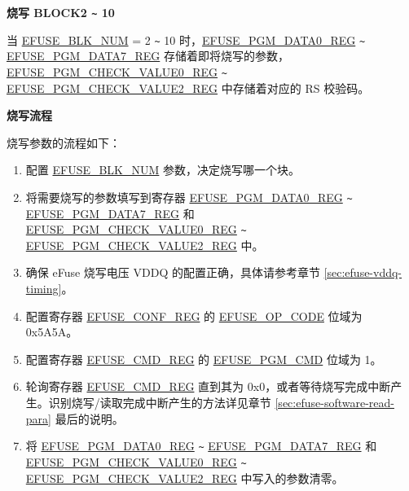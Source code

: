 \documentclass[main\_\_CN.tex]{subfiles}
\begin{document}
{\bfseries 烧写 BLOCK2 \verb+~+ 10}

当 \hyperref[fielddesc:EFUSEBLKNUM]{EFUSE\_BLK\_NUM} = 2 \verb+~+ 10 时，\hyperref[regdesc:EFUSEPGMDATA0REG]{EFUSE\_PGM\_DATA0\_REG} \verb+~+ \hyperref[regdesc:EFUSEPGMDATA7REG]{EFUSE\_PGM\_DATA7\_REG} 存储着即将烧写的参数，\hyperref[regdesc:EFUSEPGMCHECKVALUE0REG]{EFUSE\_PGM\_CHECK\_VALUE0\_REG}  \verb+~+ \hyperref[regdesc:EFUSEPGMCHECKVALUE2REG]{EFUSE\_PGM\_CHECK\_VALUE2\_REG} 中存储着对应的 RS 校验码。

{\bfseries 烧写流程}

烧写参数的流程如下：
\begin{enumerate}
\item 配置 \hyperref[fielddesc:EFUSEBLKNUM]{EFUSE\_BLK\_NUM} 参数，决定烧写哪一个块。

\item 将需要烧写的参数填写到寄存器 \hyperref[regdesc:EFUSEPGMDATA0REG]{EFUSE\_PGM\_DATA0\_REG} \verb+~+ \hyperref[regdesc:EFUSEPGMDATA7REG]{EFUSE\_PGM\_DATA7\_REG} 和\\ \hyperref[regdesc:EFUSEPGMCHECKVALUE0REG]{EFUSE\_PGM\_CHECK\_VALUE0\_REG}  \verb+~+  \hyperref[regdesc:EFUSEPGMCHECKVALUE2REG]{EFUSE\_PGM\_CHECK\_VALUE2\_REG} 中。


\item 确保 eFuse 烧写电压 VDDQ 的配置正确，具体请参考章节 \ref{sec:efuse-vddq-timing}。

\item 配置寄存器 \hyperref[regdesc:EFUSECONFREG]{EFUSE\_CONF\_REG} 的 \hyperref[fielddesc:EFUSEOPCODE]{EFUSE\_OP\_CODE} 位域为 0x5A5A。

\item 配置寄存器 \hyperref[regdesc:EFUSECMDREG]{EFUSE\_CMD\_REG} 的 \hyperref[fielddesc:EFUSEPGMCMD]{EFUSE\_PGM\_CMD} 位域为 1。

\item 轮询寄存器 \hyperref[regdesc:EFUSECMDREG]{EFUSE\_CMD\_REG} 直到其为 0x0，或者等待烧写完成中断产生。识别烧写/读取完成中断产生的方法详见章节 \ref{sec:efuse-software-read-para} 最后的说明。

\item 将 \hyperref[regdesc:EFUSEPGMDATA0REG]{EFUSE\_PGM\_DATA0\_REG} \verb+~+ \hyperref[regdesc:EFUSEPGMDATA7REG]{EFUSE\_PGM\_DATA7\_REG} 和\\ \hyperref[regdesc:EFUSEPGMCHECKVALUE0REG]{EFUSE\_PGM\_CHECK\_VALUE0\_REG}  \verb+~+  \hyperref[regdesc:EFUSEPGMCHECKVALUE2REG]{EFUSE\_PGM\_CHECK\_VALUE2\_REG} 中写入的参数清零。


\end{enumerate}
\end{document}

